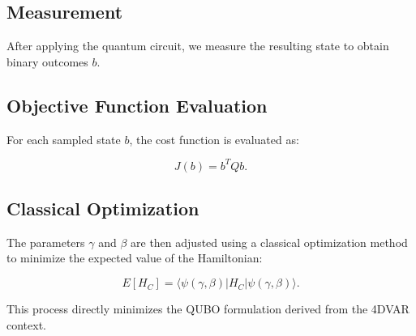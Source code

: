 \documentclass{article}
\begin{document}
\subsection{Measurement}
After applying the quantum circuit, we measure the resulting state to obtain binary outcomes \( b \).

\subsection{Objective Function Evaluation}
For each sampled state \( b \), the cost function is evaluated as:

\begin{equation}
J(b) = b^T Q b.
\end{equation}

\subsection{Classical Optimization}
The parameters \( \gamma \) and \( \beta \) are then adjusted using a classical optimization method to minimize the expected value of the Hamiltonian:

\begin{equation}
E[H_C] = \langle \psi(\gamma, \beta) | H_C | \psi(\gamma, \beta) \rangle.
\end{equation}

This process directly minimizes the QUBO formulation derived from the 4DVAR context.
\end{document}
